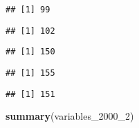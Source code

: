 \documentclass[
]{article}
\newenvironment{Shaded}{\begin{snugshade}}{\end{snugshade}}
\newcommand{\DecValTok}[1]{\textcolor[rgb]{0.00,0.00,0.81}{#1}}
\newcommand{\KeywordTok}[1]{\textcolor[rgb]{0.13,0.29,0.53}{\textbf{#1}}}
\newcommand{\NormalTok}[1]{#1}
\newcommand{\OperatorTok}[1]{\textcolor[rgb]{0.81,0.36,0.00}{\textbf{#1}}}
\begin{document}
\begin{verbatim}
## [1] 99
\end{verbatim}

\begin{Shaded}
\end{Shaded}

\begin{verbatim}
## [1] 102
\end{verbatim}

\begin{Shaded}
\end{Shaded}

\begin{verbatim}
## [1] 150
\end{verbatim}

\begin{Shaded}
\end{Shaded}

\begin{verbatim}
## [1] 155
\end{verbatim}

\begin{Shaded}
\end{Shaded}

\begin{verbatim}
## [1] 151
\end{verbatim}

\begin{Shaded}
\begin{Highlighting}[]
\KeywordTok{summary}\NormalTok{(variables_}\DecValTok{2000}\NormalTok{_}\DecValTok{2}\NormalTok{)}
\end{Highlighting}
\end{Shaded}
\end{document}
